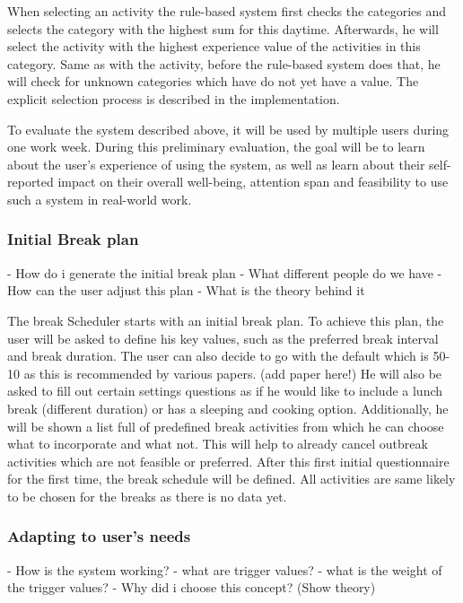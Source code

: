 \documentclass{hasel_thesis}
\begin{document}
When selecting an activity the rule-based system first checks the categories and selects the category with the highest sum for this daytime. Afterwards, he will select the activity with the highest experience value of the activities in this category. Same as with the activity, before the rule-based system does that, he will check for unknown categories which have do not yet have a value. The explicit selection process is described in the implementation.
 
To evaluate the system described above, it will be used by multiple users during one work week. During this preliminary evaluation, the goal will be to learn about the user’s experience of using the system, as well as learn about their self-reported impact on their overall well-being, attention span and feasibility to use such a system in real-world work.

\subsubsection{Initial Break plan}
- How do i generate the initial break plan
- What different people do we have
- How can the user adjust this plan
- What is the theory behind it

The break Scheduler starts with an initial break plan. To achieve this plan, the user will be asked to define his key values, such as the preferred break interval and break duration. The user can also decide to go with the default which is 50-10 as this is recommended by various papers. (add paper here!) He will also be asked to fill out certain settings questions as if he would like to include a lunch break (different duration) or has a sleeping and cooking option. Additionally, he will be shown a list full of predefined break activities from which he can choose what to incorporate and what not. This will help to already cancel outbreak activities which are not feasible or preferred. After this first initial questionnaire for the first time, the break schedule will be defined. All activities are same likely to be chosen for the breaks as there is no data yet. 
\subsubsection{Adapting to user's needs}
- How is the system working?
- what are trigger values?
- what is the weight of the trigger values?
- Why did i choose this concept? (Show theory)
\end{document}
